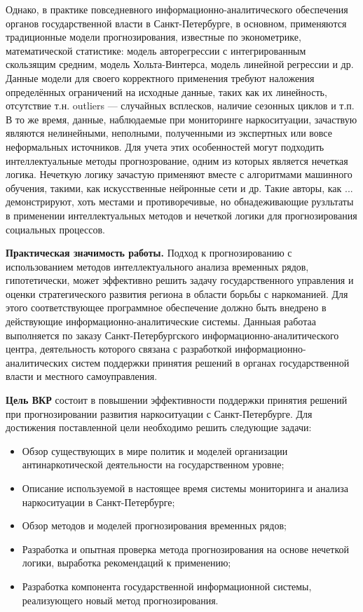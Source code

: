 Однако, в практике повседневного информационно-аналитического обеспечения
органов государственной власти в Санкт-Петербурге, в основном, применяются
традиционные модели прогнозирования, известные по эконометрике, математической
статистике: модель авторегрессии с интегрированным скользящим средним, модель
Хольта-Винтерса, модель линейной регрессии и др. Данные модели для своего
корректного применения требуют наложения определённых ограничений на исходные
данные, таких как их линейность, отсутствие т.н. outliers --- случайных
всплесков, наличие сезонных циклов и т.п. В то же время, данные, наблюдаемые при
мониторинге наркоситуации, зачаствую являются нелинейными, неполными,
полученными из экспертных или вовсе неформальных источников. Для учета этих
особенностей могут подходить интеллектуальные методы прогнозрование, одним из
которых является нечеткая логика. Нечеткую логику зачастую применяют вместе с
алгоритмами машинного обучения, такими, как искусственные нейронные сети и др.
Такие авторы, как ... демонстрируют, хоть местами и противоречивые, но
обнадеживающие рузльтаты в применении интеллектуальных методов и нечеткой логики
для прогнозирования социальных процессов. 

\textbf{Практическая значимость работы.} Подход к прогнозированию с
использованием методов интеллектуального анализа временных рядов, гипотетически,
может эффективно решить задачу государственного управления и оценки
стратегического развития региона в области борьбы с наркоманией. Для этого
соответствующее программное обеспечение должно быть внедрено в действующие
информационно-аналитические системы. Данныая работаа выполняется по заказу
Санкт-Петербургского информационно-аналитического центра, деятельность которого
связана с разработкой информационно-аналитических систем поддержки принятия
решений в органах государственной власти и местного самоуправления.

\textbf{Цель ВКР} состоит в повышении эффективности поддержки принятия решений
при прогнозировании развития наркоситуации с Санкт-Петербурге. Для достижения
поставленной цели необходимо решить следующие задачи:
\begin{itemize}
\item Обзор существующих в мире политик и моделей организации антинаркотической
деятельности на государственном уровне;
\item Описание используемой в настоящее время системы мониторинга и анализа
наркоситуации в Санкт-Петербурге;
\item Обзор методов и моделей прогнозирования временных рядов;
\item Разработка и опытная проверка метода прогнозирования на основе нечеткой
логики, выработка рекомендаций к применению;
\item Разработка компонента государственной информационной системы, реализующего
новый метод прогнозирования.
\end{itemize}




